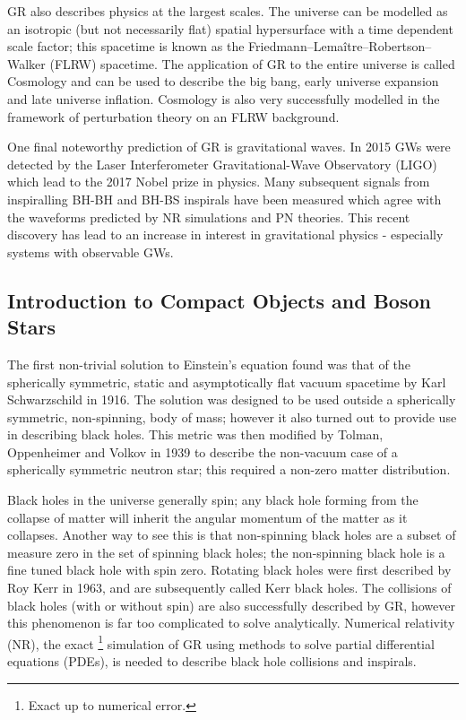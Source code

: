 GR also describes physics at the largest scales. The universe can be modelled as an isotropic (but not necessarily flat) spatial hypersurface with a time dependent scale factor; this spacetime is known as the Friedmann–Lemaître–Robertson–Walker (FLRW) spacetime. The application of GR to the entire universe is called Cosmology and can be used to describe the big bang, early universe expansion and late universe inflation. Cosmology is also very successfully modelled in the framework of perturbation theory on an FLRW background.

One final noteworthy prediction of GR is gravitational waves. In 2015 GWs were detected by the Laser Interferometer Gravitational-Wave Observatory (LIGO) which lead to the 2017 Nobel prize in physics. Many subsequent signals from inspiralling BH-BH and BH-BS inspirals have been measured which agree with the waveforms predicted by NR simulations and PN theories. This recent discovery has lead to an increase in interest in gravitational physics - especially systems with observable GWs.



\subsection{Introduction to Compact Objects and Boson Stars}
The first non-trivial solution to Einstein's equation found was that of the spherically symmetric, static and asymptotically flat vacuum spacetime by Karl Schwarzschild in 1916. The solution was designed to be used outside a spherically symmetric, non-spinning, body of mass; however it also turned out to provide use in describing black holes. This metric was then modified by Tolman, Oppenheimer and Volkov in 1939 to describe the non-vacuum case of a spherically symmetric neutron star; this required a non-zero matter distribution.

Black holes in the universe generally spin; any black hole forming from the collapse of matter will inherit the angular momentum of the matter as it collapses. Another way to see this is that non-spinning black holes are a subset of measure zero in the set of spinning black holes; the non-spinning black hole is a fine tuned black hole with spin zero. Rotating black holes were first described by Roy Kerr in 1963, and are subsequently called Kerr black holes. The collisions of black holes (with or without spin) are also successfully described by GR, however this phenomenon is far too complicated to solve analytically. Numerical relativity (NR), the exact \footnote{Exact up to numerical error.} simulation of GR using methods to solve partial differential equations (PDEs), is needed to describe black hole collisions and inspirals.

